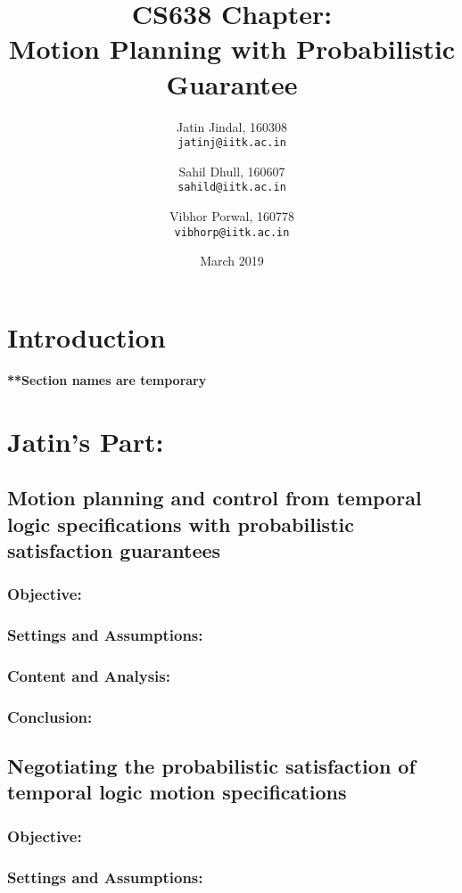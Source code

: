 \documentclass{article}
\title{
    CS638 Chapter: \\
    Motion Planning with Probabilistic Guarantee
}
\author{
    Jatin Jindal, 160308\\
    \texttt{jatinj@iitk.ac.in}
    \and
    Sahil Dhull, 160607\\
    \texttt{sahild@iitk.ac.in}
    \and
    Vibhor Porwal, 160778\\
    \texttt{vibhorp@iitk.ac.in}
}
\date{March 2019}
\begin{document}
\maketitle

\section{Introduction}
\textbf{**Section names are temporary}

\section{Jatin's Part:}
\subsection{Motion planning and control from temporal logic specifications with probabilistic satisfaction guarantees}
\subsubsection{Objective:}

\subsubsection{Settings and Assumptions:}

\subsubsection{Content and Analysis:}

\subsubsection{Conclusion:}

\subsection{Negotiating the probabilistic satisfaction of temporal logic motion specifications}
\subsubsection{Objective:}

\subsubsection{Settings and Assumptions:}
\end{document}
